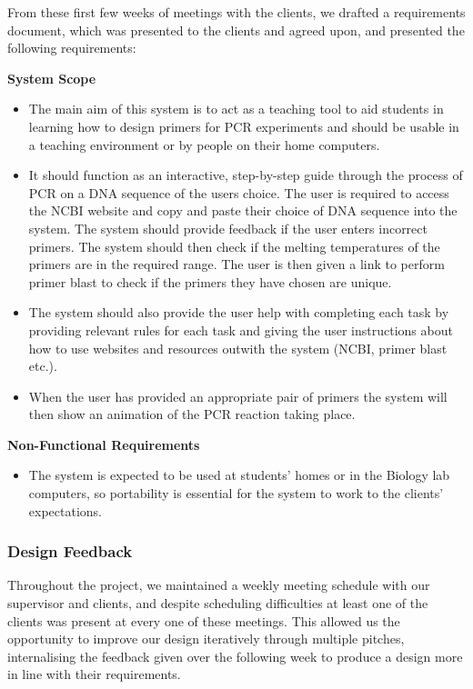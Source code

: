 From these first few weeks of meetings with the clients, we drafted a
requirements document, which was presented to the clients and agreed upon,
and presented the following requirements:

\textbf{System Scope}
\begin{itemize}
\item{The main aim of this system is to act as a teaching tool to aid students in learning how to design
primers for PCR experiments and should be usable in a teaching environment or by people on their
home computers.}
\item{It should function as an interactive, step-by-step guide through the process of PCR on a DNA sequence
of the users choice. The user is required to access the NCBI website and copy and paste their choice
of DNA sequence into the system. The system should provide feedback if the user enters incorrect
primers. The system should then check if the melting temperatures of the primers are in the required
range. The user is then given a link to perform primer blast to check if the primers they have chosen
are unique.}
\item{The system should also provide the user help with completing each task by providing relevant rules
for each task and giving the user instructions about how to use websites and resources outwith the
system (NCBI, primer blast etc.).}
\item{When the user has provided an appropriate pair of primers the system will then show an animation of
the PCR reaction taking place.}
\end{itemize}
\textbf{Non-Functional Requirements}
\begin{itemize}
\item{The system is expected to be used at students’ homes or in the Biology lab computers, so
portability is essential for the system to work to the clients’ expectations.}
\end{itemize}


\subsubsection{Design Feedback}
Throughout the project, we maintained a weekly meeting schedule with our
supervisor and clients, and despite scheduling difficulties at least one
of the clients was present at every one of these meetings. This allowed
us the opportunity to improve our design iteratively through multiple
pitches, internalising the feedback given over the following week to 
produce a design more in line with their requirements.

